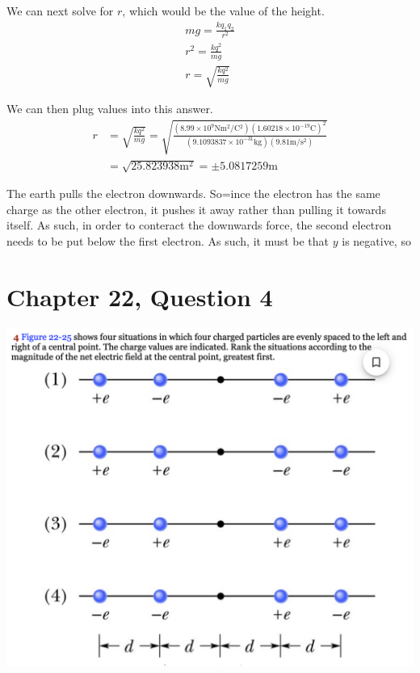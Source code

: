 \documentclass[12pt]{article}
\begin{document}
We can next solve for $r$, which would be the value of the height.
\begin{gather*}
    mg = \frac{kq_1 q_2}{r^2}\\
    r^2 = \frac{k q^2}{mg}\\
    r = \sqrt{\frac{k q^2}{mg}}
\end{gather*}

We can then plug values into this answer.
\begin{align*}
    r   &=  \sqrt{\frac{k q^2}{mg}}
        =   \sqrt{\frac{(8.99 \times 10^{9} \unit{\newton\meter^2/\coulomb^2}) (1.60218 \times 10^{-19} \unit{\coulomb})^2}{(9.1093837 \times 10^{-31} \unit{\kilo\gram})(9.81 \unit{\meter/\second^2})}}\\
        &=  \sqrt{25.823938 \unit{\meter^2}}
        =   \pm 5.0817259 \unit{\meter}
\end{align*}

The earth pulls the electron downwards. So=ince the electron has the same charge as the other electron, it pushes it away rather than pulling it towards itself. As such, in order to conteract the downwards force, the second electron needs to be put below the first electron. As such, it must be that $y$ is negative, so 

\pagebreak
\section*{Chapter 22, Question 4}
\includegraphics[width=\textwidth]{picture_3.png}
\end{document}
